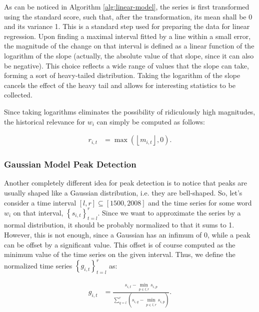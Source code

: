 As can be noticed in Algorithm \autoref{alg:linear-model}, the series is first transformed using the standard score, such that, after the transformation, its mean shall be 0 and its variance 1. This is a standard step used for preparing the data for linear regression. Upon finding a maximal interval fitted by a line within a small error, the magnitude of the change on that interval is defined as a linear function of the logarithm of the slope (actually, the absolute value of that slope, since it can also be negative). This choice reflects a wide range of values that the slope can take, forming a sort of heavy-tailed distribution. Taking the logarithm of the slope cancels the effect of the heavy tail and allows for interesting statistics to be collected.

Since taking logarithms eliminates the possibility of ridiculously high magnitudes, the historical relevance for $w_i$ can simply be computed as follows:

\begin{align}
\label{eq:linear-model-relevance}
r_{i, t} &= \max \left( \left\lfloor m_{i, t} \right\rfloor, 0 \right).
\end{align}

\subsubsection{Gaussian Model Peak Detection}

Another completely different idea for peak detection is to notice that peaks are usually shaped like a Gaussian distribution, i.e. they are bell-shaped. So, let's consider a time interval $\left[ l, r \right] \subseteq \left[ 1500, 2008 \right]$ and the time series for some word $w_i$ on that interval, $\left\{ s_{i, t} \right\}_{t=l}^{r}$. Since we want to approximate the series by a normal distribution, it should be probably normalized to that it sums to 1. However, this is not enough, since a Gaussian has an infimum of 0, while a peak can be offset by a significant value. This offset is of course computed as the minimum value of the time series on the given interval. Thus, we define the normalized time series $\left\{ g_{i, t} \right\}_{t=l}^{r}$ as:

\begin{align}
\label{eq:gaussian-normalization}
g_{i, t} &= \frac{s_{i, t} - \min_{p \in \overline{l, r}} s_{i, p}}{\sum_{q = l}^{r} \left( s_{i, q} - \min_{p \in \overline{l, r}} s_{i, p} \right)}.
\end{align}

